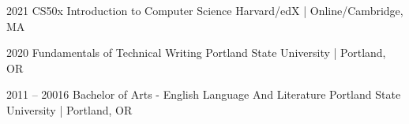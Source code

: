 \documentclass[9pt]{developercv} %
\begin{document}
	\vspace{56pt}
\begin{entrylist}
	\entry
		{2021}
		{CS50x Introduction to Computer Science}
		{Harvard/edX | Online/Cambridge, MA}
		
	\entry
		{2020}
		{Fundamentals of Technical Writing}
		{Portland State University | Portland, OR}

	\entry
		{2011 -- 20016}
		{Bachelor of Arts - English Language And Literature}
		{Portland State University | Portland, OR}

\end{entrylist}

\end{document}

